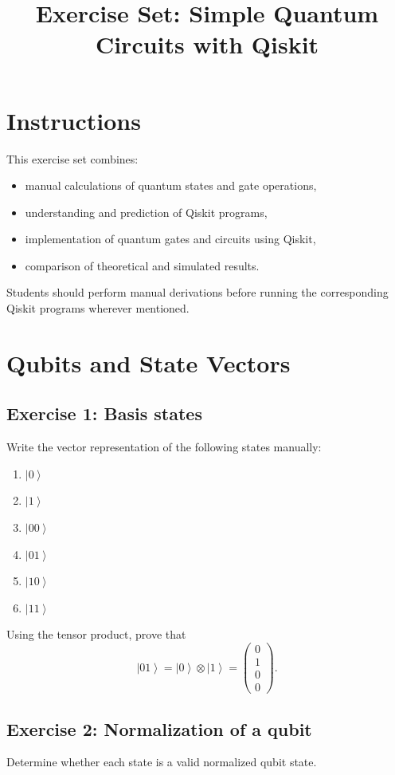 \documentclass[12pt,a4paper]{article}
\title{\textbf{Exercise Set: Simple Quantum Circuits with Qiskit}}
\author{}
\date{}
\newcommand{\ket}[1]{\left|#1\right\rangle}
\begin{document}
\maketitle

\section*{Instructions}
This exercise set combines:
\begin{itemize}
    \item manual calculations of quantum states and gate operations,
    \item understanding and prediction of Qiskit programs,
    \item implementation of quantum gates and circuits using Qiskit,
    \item comparison of theoretical and simulated results.
\end{itemize}

Students should perform manual derivations before running the corresponding Qiskit programs wherever mentioned.

\section{Qubits and State Vectors}

\subsection*{Exercise 1: Basis states}
Write the vector representation of the following states manually:
\begin{enumerate}
    \item $\ket{0}$
    \item $\ket{1}$
    \item $\ket{00}$
    \item $\ket{01}$
    \item $\ket{10}$
    \item $\ket{11}$
\end{enumerate}

Using the tensor product, prove that
\[
\ket{01}=\ket{0}\otimes\ket{1}=\begin{pmatrix}0\\1\\0\\0\end{pmatrix}.
\]

\subsection*{Exercise 2: Normalization of a qubit}
Determine whether each state is a valid normalized qubit state.
\end{document}
